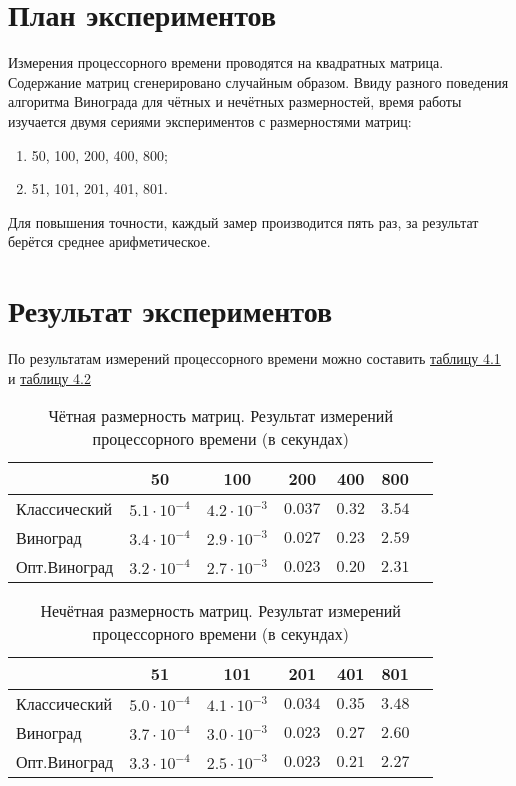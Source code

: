 \section{План экспериментов}
Измерения процессорного времени проводятся на квадратных матрица. Содержание матриц сгенерировано случайным образом. Ввиду разного поведения алгоритма Винограда для чётных и нечётных размерностей, время работы изучается двумя сериями экспериментов с размерностями матриц:
\begin{enumerate}
	\item 50, 100, 200, 400, 800;
	\item 51, 101, 201, 401, 801.
\end{enumerate}

Для повышения точности, каждый замер производится пять раз, за результат берётся среднее арифметическое.


\section{Результат экспериментов}
По результатам измерений процессорного времени можно составить \hyperref[table_4_1]{таблицу 4.1} и \hyperref[table_4_2]{таблицу 4.2}

\begin{table}[h] \label{table_4_1}
\caption{Чётная размерность матриц. Результат измерений процессорного времени (в секундах)}
\begin{tabular}{| p{3.5cm} | c | c | c | c | c | c |}
	\hline
					& 50				&100				&200			&400		&800	\\
	\hline\hline
	Классический	&$5.1\cdot10^{-4}$	&$4.2\cdot10^{-3}$	&$0.037$		&$0.32$		&$3.54$	\\
	\hline
	Виноград		&$3.4\cdot10^{-4}$	&$2.9\cdot10^{-3}$	&$0.027$		&$0.23$		&$2.59$	\\
	\hline
	Опт.Виноград	&$3.2\cdot10^{-4}$	&$2.7\cdot10^{-3}$	&$0.023$		&$0.20$		&$2.31$	\\
	\hline
\end{tabular}
\end{table}


\begin{table}[h] \label{table_4_2}
	\caption{Нечётная размерность матриц. Результат измерений процессорного времени (в секундах)}
	\begin{tabular}{| p{3.5cm} | c | c | c | c | c | c |}
		\hline
						& 51				&101				&201			&401		&801	\\
		\hline\hline
		Классический	&$5.0\cdot10^{-4}$	&$4.1\cdot10^{-3}$	&$0.034$		&$0.35$		&$3.48$	\\
		\hline
		Виноград		&$3.7\cdot10^{-4}$	&$3.0\cdot10^{-3}$	&$0.023$		&$0.27$		&$2.60$	\\
		\hline
		Опт.Виноград	&$3.3\cdot10^{-4}$	&$2.5\cdot10^{-3}$	&$0.023$		&$0.21$		&$2.27$	\\
		\hline
	\end{tabular}
\end{table}

